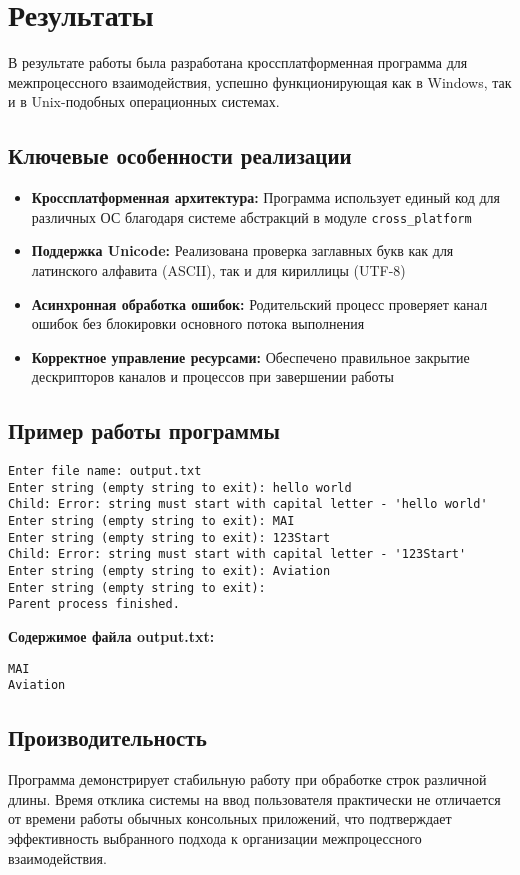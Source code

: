 \section{Результаты}

В результате работы была разработана кроссплатформенная программа для межпроцессного взаимодействия, успешно функционирующая как в Windows, так и в Unix-подобных операционных системах.

\subsection{Ключевые особенности реализации}

\begin{itemize}
    \item \textbf{Кроссплатформенная архитектура:} Программа использует единый код для различных ОС благодаря системе абстракций в модуле \texttt{cross\_platform}
    \item \textbf{Поддержка Unicode:} Реализована проверка заглавных букв как для латинского алфавита (ASCII), так и для кириллицы (UTF-8)
    \item \textbf{Асинхронная обработка ошибок:} Родительский процесс проверяет канал ошибок без блокировки основного потока выполнения
    \item \textbf{Корректное управление ресурсами:} Обеспечено правильное закрытие дескрипторов каналов и процессов при завершении работы
\end{itemize}

\subsection{Пример работы программы}

\begin{verbatim}
Enter file name: output.txt
Enter string (empty string to exit): hello world
Child: Error: string must start with capital letter - 'hello world'
Enter string (empty string to exit): MAI
Enter string (empty string to exit): 123Start
Child: Error: string must start with capital letter - '123Start'
Enter string (empty string to exit): Aviation
Enter string (empty string to exit):
Parent process finished.
\end{verbatim}

\noindent\textbf{Содержимое файла output.txt:}
\begin{verbatim}
MAI
Aviation
\end{verbatim}

\subsection{Производительность}

Программа демонстрирует стабильную работу при обработке строк различной длины. Время отклика системы на ввод пользователя практически не отличается от времени работы обычных консольных приложений, что подтверждает эффективность выбранного подхода к организации межпроцессного взаимодействия.
